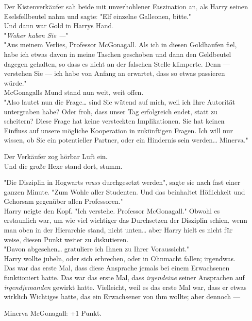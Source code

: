 {Der Kistenverkäufer sah beide mit unverhohlener Faszination an, als Harry seinen Eselsfellbeutel nahm und sagte: "Elf einzelne Galleonen, bitte."\\ Und dann war Gold in Harrys Hand.\\ "\emph{Woher haben Sie ---}"\\ "Aus meinem Verlies, Professor McGonagall. Als ich in diesen Goldhaufen fiel, habe ich etwas davon in meine Taschen geschoben und dann den Geldbeutel dagegen gehalten, so dass es nicht an der falschen Stelle klimperte. Denn --- verstehen Sie --- ich habe von Anfang an erwartet, dass so etwas passieren würde."\\ McGonagalls Mund stand nun weit, weit offen.\\ "Also lautet nun die Frage… sind Sie wütend auf mich, weil ich Ihre Autorität untergraben habe? Oder froh, dass unser Tag erfolgreich endet, statt zu scheitern? Diese Frage hat keine versteckten Implikationen. Sie hat keinen Einfluss auf unsere mögliche Kooperation in zukünftigen Fragen. Ich will nur wissen, ob Sie ein potentieller Partner, oder ein Hindernis sein werden… Minerva."

Der Verkäufer zog hörbar Luft ein.\\ Und die große Hexe stand dort, stumm.

"Die Disziplin in Hogwarts \emph{muss} durchgesetzt werden", sagte sie nach fast einer ganzen Minute. "Zum Wohle aller Studenten. Und das beinhaltet Höflichkeit und Gehorsam gegenüber allen Professoren."\\ Harry neigte den Kopf. "Ich verstehe. Professor McGonagall." Obwohl es erstaunlich war, um wie viel wichtiger das Durchsetzen der Disziplin schien, wenn man oben in der Hierarchie stand, nicht unten… aber Harry hielt es nicht für weise, diesen Punkt weiter zu diskutieren.\\ "Davon abgesehen… gratuliere ich Ihnen zu Ihrer Voraussicht."\\ Harry wollte jubeln, oder sich erbrechen, oder in Ohnmacht fallen; irgendwas. Das war das erste Mal, dass diese Ansprache jemals bei einem Erwachsenen funktioniert hatte. Das war das erste Mal, dass \emph{irgendeine} seiner Ansprachen auf \emph{irgendjemanden} gewirkt hatte. Vielleicht, weil es das erste Mal war, dass er etwas wirklich Wichtiges hatte, das ein Erwachsener von ihm wollte; aber dennoch ---

Minerva McGonagall: +1 Punkt.

}
